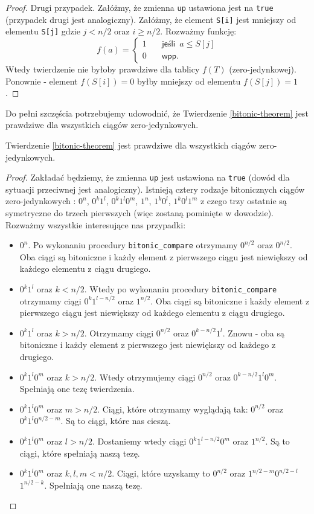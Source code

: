 \begin{proof}
 Drugi przypadek.
 Załóżmy, że zmienna \texttt{up} ustawiona jest na \texttt{true} (przypadek drugi jest analogiczny).
 Załóżmy, że element \texttt{S[i]} jest mniejszy od elementu \texttt{S[j]} gdzie $j < n/2$ oraz $i \geq n/2$.
 Rozważmy funkcję:
  \[   
  f(a) = 
     \begin{cases}
       1 &\quad\textsf{jeśli} \enspace a \leq S[j]\\
       0 &\quad\textsf{wpp.}
     \end{cases}
 \]
 Wtedy twierdzenie nie byłoby prawdziwe dla tablicy $f(T)$ (zero-jedynkowej).
 Ponownie - element $f(S[i]) = 0$ byłby mniejszy od elementu $f(S[j]) = 1$.
\end{proof}

Do pełni szczęścia potrzebujemy udowodnić, że Twierdzenie \ref{bitonic-theorem} jest prawdziwe dla wszystkich ciągów zero-jedynkowych.

\begin{lemma}
 Twierdzenie \ref{bitonic-theorem} jest prawdziwe dla wszystkich ciągów zero-jedynkowych.
 \label{zero-one-cases-lemma}
\end{lemma}

\begin{proof}
 Zakładać będziemy, że zmienna \texttt{up} jest ustawiona na \texttt{true} (dowód dla sytuacji przeciwnej jest analogiczny).
 Istnieją cztery rodzaje bitonicznych ciągów zero-jedynkowych : $0^n$, $0^k1^l$, $0^k1^l0^m$, $1^n$, $1^k0^l$, $1^k0^l1^m$ z czego trzy ostatnie są symetryczne do trzech pierwszych (więc zostaną pominięte w dowodzie).
 Rozważmy wszystkie interesujące nas przypadki:
 \begin{itemize}
  \item $0^n$.
   Po wykonaniu procedury \texttt{bitonic\_compare} otrzymamy $0^{n/2}$ oraz $0^{n/2}$.
   Oba ciągi są bitoniczne i każdy element z pierwszego ciągu jest niewiększy od każdego elementu z ciągu drugiego.
  \item $0^k1^l$ oraz $k < n/2$.
   Wtedy po wykonaniu procedury \texttt{bitonic\_compare} otrzymamy ciągi $0^k1^{l-n/2}$ oraz $1^{n/2}$.
   Oba ciągi są bitoniczne i każdy element z pierwszego ciągu jest niewiększy od każdego elementu z ciągu drugiego.
  \item $0^k1^l$ oraz $k > n/2$.
   Otrzymamy ciągi $0^{n/2}$ oraz $0^{k-n/2}1^l$.
   Znowu - oba są bitoniczne i każdy element z pierwszego jest niewiększy od każdego z drugiego.
  \item $0^k1^l0^m$ oraz $k > n/2$.
   Wtedy otrzymujemy ciągi $0^{n/2}$ oraz $0^{k-n/2}1^l0^m$.
   Spełniają one tezę twierdzenia.
  \item $0^k1^l0^m$ oraz $m > n/2$.
   Ciągi, które otrzymamy wyglądają tak: $0^{n/2}$ oraz $0^k1^l0^{n/2-m}$.
   Są to ciągi, które nas cieszą.
  \item $0^k1^l0^m$ oraz $l > n/2$.
   Dostaniemy wtedy ciągi $0^k1^{l-n/2}0^m$ oraz $1^{n/2}$.
   Są to ciągi, które spełniają naszą tezę.
  \item $0^k1^l0^m$ oraz $k, l, m < n/2$.
   Ciągi, które uzyskamy to $0^{n/2}$ oraz $1^{n/2-m}0^{n/2-l}$ $1^{n/2-k}$.
   Spełniają one naszą tezę.
 \end{itemize}
\end{proof}

